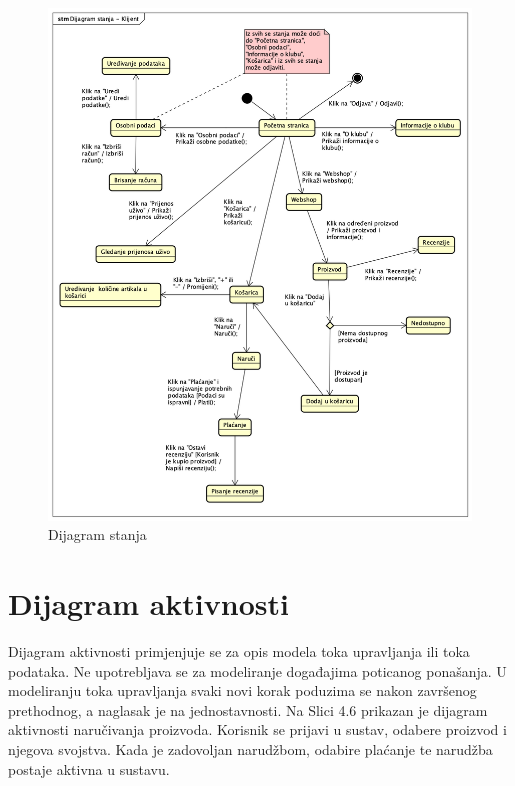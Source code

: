 			\begin{figure}[H]
				\includegraphics[width=\linewidth]{dijagrami/Dijagram_stanja.png}
				\centering
				\caption{Dijagram stanja }
				\label{fig:ClassDiagram1}
			\end{figure}
			
			
		
		 \section{Dijagram aktivnosti}
			
			
		 \textnormal{Dijagram aktivnosti primjenjuje se za opis modela toka upravljanja ili toka podataka. Ne upotrebljava se za modeliranje događajima poticanog ponašanja. U modeliranju toka upravljanja svaki novi korak poduzima se nakon završenog prethodnog, a naglasak je na jednostavnosti. Na Slici 4.6 prikazan je dijagram aktivnosti naručivanja proizvoda. Korisnik se prijavi u sustav, odabere proizvod i njegova svojstva. Kada je zadovoljan narudžbom, odabire plaćanje te narudžba postaje aktivna u sustavu.}
		
